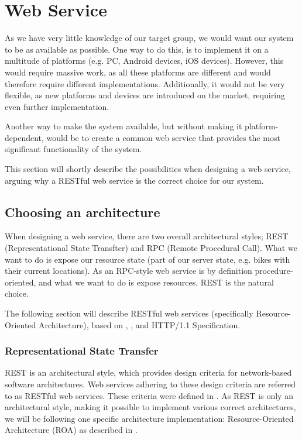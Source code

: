 \section{Web Service}
As we have very little knowledge of our target group, we would want our system to be as available as possible.
One way to do this, is to implement it on a multitude of platforms (e.g. PC, Android devices, iOS devices).
However, this would require massive work, as all these platforms are different and would therefore require different implementations.
Additionally, it would not be very flexible, as new platforms and devices are introduced on the market, requiring even further implementation.

Another way to make the system available, but without making it platform-dependent, would be to create a common web service that provides the most significant functionality of the system.

This section will shortly describe the possibilities when designing a web service, arguing why a RESTful web service is the correct choice for our system.

\subsection{Choosing an architecture}
When designing a web service, there are two overall architectural styles; REST (Representational State Transfter) and RPC (Remote Procedural Call).\cite{restful_web_services}
What we want to do is expose our resource state (part of our server state, e.g. bikes with their current locations).
As an RPC-style web service is by definition procedure-oriented, and what we want to do is expose resources, REST is the natural choice.

The following section will describe RESTful web services (specifically Resource-Oriented Architecture), based on  \citet{restful_web_services}, \citet{fielding_dissertation}, and HTTP/1.1 Specification\cite{http_specification}.

\subsubsection{Representational State Transfer}
REST is an architectural style, which provides design criteria for network-based software architectures.
Web services adhering to these design criteria are referred to as RESTful web services.
These criteria were defined in \citet{fielding_dissertation}.
As REST is only an architectural style, making it possible to implement various correct architectures, we will be following one specific architecture implementation: Resource-Oriented Architecture (ROA) as described in \citet{restful_web_services}.

